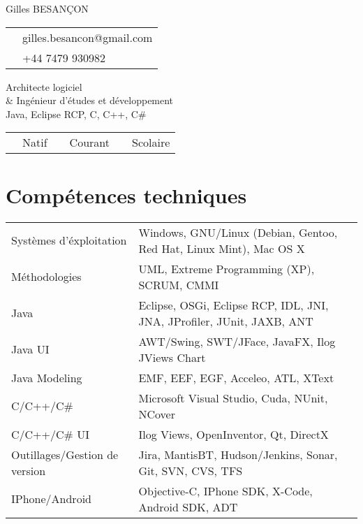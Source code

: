 \documentclass[10pt,letterpaper]{resume/resume}
\begin{document}
  \begin{minipage}[t]{\linewidth * 1 / 3}
    {\Large Gilles BESAN\c{C}ON}\\
      \begin{tabular}{c l}
         \email{&gilles.besancon@gmail.com}\\
         \phone{&+44 7479 930982}\\
      \end{tabular}
  \end{minipage}
  \begin{minipage}[t]{\linewidth * 2 / 3}
    \begin{center}
      {\huge{Architecte logiciel\\\& Ing\'enieur d'\'etudes et d\'eveloppement\\Java, Eclipse RCP, C, C++, C\#}}
      \begin{tabular}{c l c l c l}
      \french{Fran\c{c}ais:&Natif}&\englishus{Anglais:&Courant}&\spanish{Espagnol:&Scolaire}\\
      \end{tabular}
    \end{center}
  \end{minipage}

  \begin{minipage}[t]{\linewidth}
    \section{Comp\'etences techniques}
    \begin{tabular}{ll}
	Systèmes d'\'exploitation&Windows, GNU/Linux (Debian, Gentoo, Red Hat, Linux Mint), Mac OS X\\
	M\'ethodologies&UML, Extreme Programming (XP), SCRUM, CMMI\\
	Java&Eclipse, OSGi, Eclipse RCP, IDL, JNI, JNA, JProfiler, JUnit, JAXB, ANT\\
	Java UI&AWT/Swing, SWT/JFace, JavaFX, Ilog JViews Chart\\
	Java Modeling&EMF, EEF, EGF, Acceleo, ATL, XText\\
	C/C++/C\#&Microsoft Visual Studio, Cuda, NUnit, NCover\\
	C/C++/C\# UI&Ilog Views, OpenInventor, Qt, DirectX\\
	Outillages/Gestion de version&Jira, MantisBT, Hudson/Jenkins, Sonar, Git, SVN, CVS, TFS\\
	IPhone/Android&Objective-C, IPhone SDK, X-Code, Android SDK, ADT\\
    \end{tabular}
  \end{minipage}
  
\end{document}
